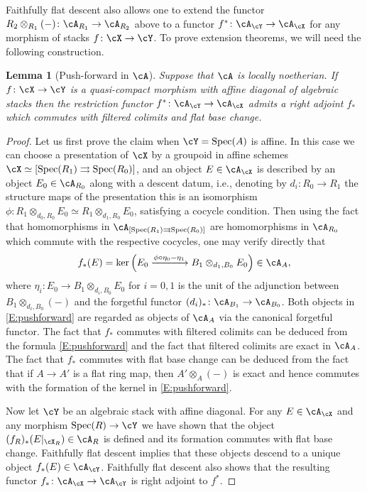 \documentclass[a4paper]{amsart}
\numberwithin{equation}{section}
\theoremstyle{plain}
\newtheorem{lem}[thm]{Lemma}
\theoremstyle{definition}
\DeclareMathOperator{\Spec}{Spec}
\newcommand{\co}{\colon}
\begin{document}
Faithfully flat descent also allows one to extend the functor $R_2 \otimes_{R_1} (-) \co \cA_{R_1} \to \cA_{R_2}$ above to a functor $f^\ast \co \cA_{\cY} \to \cA_{\cX}$ for any morphism of stacks $f \co \cX \to \cY$. To prove extension theorems, we will need the following construction.
\begin{lem}[Push-forward in $\cA$]\label{R:ChechPushForward} 	
Suppose that $\cA$ is locally noetherian. If $f\co \cX \to \cY$ is a quasi-compact morphism with affine diagonal of algebraic stacks then the restriction functor $f^*\co \cA_\cY\to \cA_\cX$ admits a right adjoint $f_\ast$ which commutes with filtered colimits and flat base change.
\end{lem}	
\begin{proof}
Let us first prove the claim when $\cY = \Spec(A)$ is affine. In this case we can choose a presentation of $\cX$ by a groupoid in affine schemes $\cX \simeq [\Spec(R_1) \rightrightarrows \Spec(R_0)]$, and an object $E \in \cA_{\cX}$ is described by an object $E_0 \in \cA_{R_0}$ along with a descent datum, i.e., denoting by $d_i\co R_0\to R_1$ the structure maps of the presentation this is an isomorphism $\phi \co R_1 \otimes_{d_0,R_0} E_0 \simeq R_1 \otimes_{d_1,R_0} E_0$, satisfying a cocycle condition.
	Then using the fact that homomorphisms in $\cA_{[\Spec(R_1) \rightrightarrows \Spec(R_0)]}$ are homomorphisms in $\cA_{R_0}$ which commute with the respective cocycles, one may verify directly that
	\begin{equation}\label{E:pushforward}
	f_\ast(E) = \ker \left( E_0 \xrightarrow{\phi \circ \eta_0 - \eta_1} B_1 \otimes_{d_1,B_0} E_0 \right) \in \cA_A,
	\end{equation}
	where $\eta_i \co E_0 \to B_1 \otimes_{d_i,B_0} E_0$ for $i=0,1$ is the unit of the adjunction between $B_1 \otimes_{d_i,B_0} (-)$ and the forgetful functor $(d_i)_\ast \co\cA_{B_1} \to \cA_{B_0}$. Both objects in \eqref{E:pushforward} are regarded as objects of $\cA_A$ via the canonical forgetful functor. {The fact that $f_\ast$ commutes with filtered colimits can be deduced from the formula \eqref{E:pushforward} and the fact that filtered colimits are exact in $\cA_A$\cite[Prop.~B2.2]{artin-zhang}. The fact that $f_\ast$ commutes with flat base change can be deduced from the fact that if $A \to A'$ is a flat ring map, then $A'\otimes_A(-)$ is exact and hence commutes with the formation of the kernel in \eqref{E:pushforward}}.
	
Now let $\cY$ be an algebraic stack with affine diagonal. For any $E \in \cA_\cX$ and any morphism $\Spec(R) \to \cY$ we have shown that the object $(f_R)_\ast(E|_{\cX_R}) \in \cA_R$ is defined and its formation commutes with flat base change. Faithfully flat descent implies that these objects descend to a unique object $f_\ast(E) \in \cA_{\cY}$. Faithfully flat descent also shows that the resulting functor $f_\ast \co\cA_\cX \to \cA_\cY$ is right adjoint to $f^\ast$.
\end{proof}	
\end{document}
